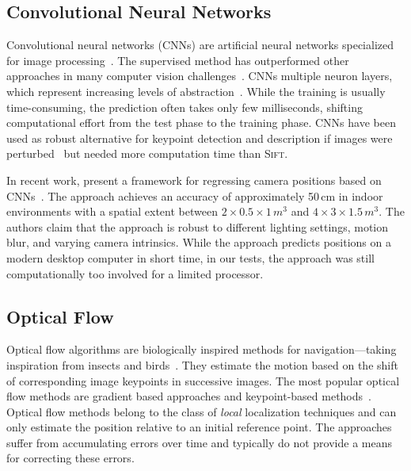 \documentclass{report}
\begin{document}
\subsection{Convolutional Neural Networks}

Convolutional neural networks (CNNs) are artificial neural networks
specialized for image processing~\cite{lecun1998gradient}. The
supervised method has outperformed other approaches in many computer
vision challenges~\cite{dosovitskiy2014discriminative}. CNNs multiple
neuron layers, which represent increasing levels of
abstraction~\cite{lecun1998gradient}. While the training is usually
time-consuming, the prediction often takes only few milliseconds,
shifting computational effort from the test phase to the training
phase. CNNs have been used as robust alternative for keypoint
detection and description if images were
perturbed~\cite{dosovitskiy2014discriminative} but needed more
computation time than \textsc{Sift}.

In recent work, \citeauthor{kendall2015posenet} present a framework
for regressing camera positions based on
CNNs~\cite{kendall2015posenet}. The approach achieves an accuracy of
approximately 50\,cm in indoor environments with a spatial extent
between $2 \times 0.5 \times 1\,m^3$ and $4 \times 3 \times
1.5\,m^3$. The authors claim that the approach is robust to different
lighting settings, motion blur, and varying camera intrinsics. While
the approach predicts positions on a modern desktop computer in short
time, in our tests, the approach was still computationally too
involved for a limited processor. 

\subsection{Optical Flow}
\label{sec:opticalflow}

Optical flow algorithms are biologically inspired methods for
navigation---taking inspiration from insects and
birds~\cite{ruffier2003bio}. They estimate the motion based on the
shift of corresponding image keypoints in successive images. The most
popular optical flow methods are gradient based approaches and
keypoint-based methods~\cite{chao2013survey}.
Optical flow methods belong to the class of \emph{local} localization
techniques and can only estimate the position relative to an initial
reference point. The approaches suffer from accumulating errors over
time and typically do not provide a means for correcting these errors.
\end{document}
